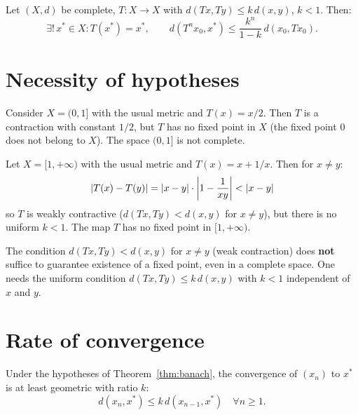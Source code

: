 \begin{keyformulas}[title=\textbf{Banach Contraction Principle}]
Let $(X, d)$ be complete, $T : X \to X$ with $d(Tx, Ty) \leq k \, d(x,y)$, $k < 1$. Then:
\[
    \exists!\, x^* \in X : T(x^*) = x^*, \qquad
    d(T^n x_0, x^*) \leq \frac{k^n}{1-k}\, d(x_0, Tx_0).
\]
\end{keyformulas}

\section{Necessity of hypotheses}

\begin{example}
Consider $X = (0, 1]$ with the usual metric and $T(x) = x/2$. Then $T$ is a
contraction with constant $1/2$, but $T$ has no fixed point in $X$ (the fixed
point $0$ does not belong to $X$). The space $(0,1]$ is not complete.
\end{example}

\begin{example}[Necessity of $k < 1$]
Let $X = [1, +\infty)$ with the usual metric and $T(x) = x + 1/x$. Then for
$x \neq y$:
\[
    \left| T(x) - T(y) \right| = \left| x - y \right| \cdot \left| 1 - \frac{1}{xy} \right| < \left| x - y \right|
\]
so $T$ is weakly contractive ($d(Tx, Ty) < d(x,y)$ for $x \neq y$), but there
is no uniform $k < 1$. The map $T$ has no fixed point in $[1, +\infty)$.
\end{example}

\begin{warning}[title=\textbf{Strict contraction vs.\ weak contraction}]
The condition $d(Tx, Ty) < d(x,y)$ for $x \neq y$ (weak contraction) does
\textbf{not} suffice to guarantee existence of a fixed point, even in a complete
space. One needs the uniform condition $d(Tx, Ty) \leq k \, d(x,y)$ with $k < 1$
independent of $x$ and $y$.
\end{warning}

\section{Rate of convergence}

\begin{proposition}
Under the hypotheses of Theorem~\ref{thm:banach}, the convergence of $(x_n)$ to
$x^*$ is at least geometric with ratio $k$:
\[
    d(x_n, x^*) \leq k \, d(x_{n-1}, x^*) \quad \forall n \geq 1.
\]
\end{proposition}

